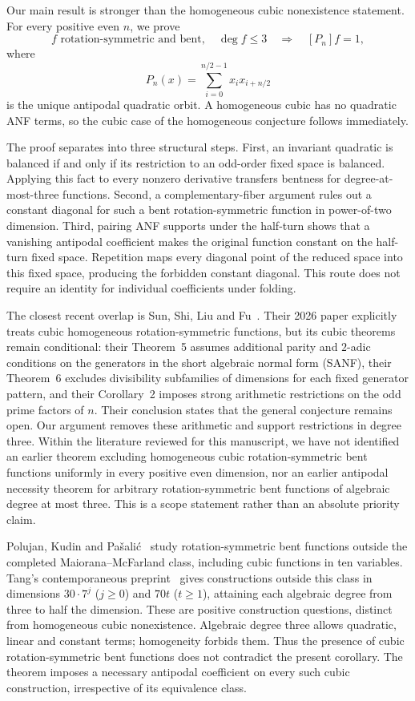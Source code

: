 \documentclass[11pt,a4paper]{article}
\theoremstyle{remark}
\theoremstyle{plain}
\begin{document}
Our main result is stronger than the homogeneous cubic nonexistence statement. For every positive even $n$, we prove
\[
\boxed{
f\text{ rotation-symmetric and bent},\quad \deg f\le3
\quad\Longrightarrow\quad
[P_n]f=1,
}
\]
where
\[
P_n(x)=\sum_{i=0}^{n/2-1}x_i x_{i+n/2}
\]
is the unique antipodal quadratic orbit. A homogeneous cubic has no quadratic ANF terms, so the cubic case of the homogeneous conjecture follows immediately.

The proof separates into three structural steps. First, an invariant quadratic is balanced if and only if its restriction to an odd-order fixed space is balanced. Applying this fact to every nonzero derivative transfers bentness for degree-at-most-three functions. Second, a complementary-fiber argument rules out a constant diagonal for such a bent rotation-symmetric function in power-of-two dimension. Third, pairing ANF supports under the half-turn shows that a vanishing antipodal coefficient makes the original function constant on the half-turn fixed space. Repetition maps every diagonal point of the reduced space into this fixed space, producing the forbidden constant diagonal. This route does not require an identity for individual coefficients under folding.

The closest recent overlap is Sun, Shi, Liu and Fu~\cite{sun}. Their 2026 paper explicitly treats cubic homogeneous rotation-symmetric functions, but its cubic theorems remain conditional: their Theorem~5 assumes additional parity and $2$-adic conditions on the generators in the short algebraic normal form (SANF), their Theorem~6 excludes divisibility subfamilies of dimensions for each fixed generator pattern, and their Corollary~2 imposes strong arithmetic restrictions on the odd prime factors of $n$. Their conclusion states that the general conjecture remains open. Our argument removes these arithmetic and support restrictions in degree three. Within the literature reviewed for this manuscript, we have not identified an earlier theorem excluding homogeneous cubic rotation-symmetric bent functions uniformly in every positive even dimension, nor an earlier antipodal necessity theorem for arbitrary rotation-symmetric bent functions of algebraic degree at most three. This is a scope statement rather than an absolute priority claim.

Polujan, Kudin and Pa\v{s}ali\'c~\cite{polujan2026} study rotation-symmetric bent functions outside the completed Maiorana--McFarland class, including cubic functions in ten variables. Tang's contemporaneous preprint~\cite{tang2026} gives constructions outside this class in dimensions $30\cdot7^j$ ($j\ge0$) and $70t$ ($t\ge1$), attaining each algebraic degree from three to half the dimension. These are positive construction questions, distinct from homogeneous cubic nonexistence. Algebraic degree three allows quadratic, linear and constant terms; homogeneity forbids them. Thus the presence of cubic rotation-symmetric bent functions does not contradict the present corollary. The theorem imposes a necessary antipodal coefficient on every such cubic construction, irrespective of its equivalence class.
\end{document}
